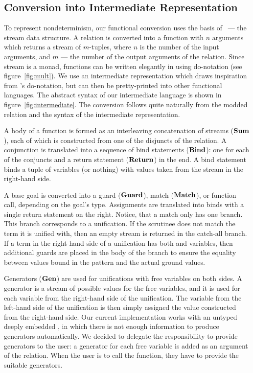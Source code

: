 

\subsection{Conversion into Intermediate Representation}

To represent nondeterminism, our functional conversion uses the basis of \mk~--- the stream data structure.
A relation is converted into a function with $n$ arguments which returns a stream of $m$-tuples, where $n$ is the number of the input arguments, and $m$ --- the number of the output arguments of the relation.
Since stream is a monad, functions can be written elegantly in \haskell using do-notation (see figure~\ref{fig:mult}).
We use an intermediate representation which draws inspiration from \haskell's do-notation, but can then be pretty-printed into other functional languages.
The abstract syntax of our intermediate language is shown in figure~\ref{fig:intermediate}.
The conversion follows quite naturally from the modded relation and the syntax of the intermediate representation.

A body of a function is formed as an interleaving concatenation of streams ($\operatorname{\mathbf{Sum}}$), each of which is constructed from one of the disjuncts of the relation.
A conjunction is translated into a sequence of bind statements ($\operatorname{\mathbf{Bind}}$): one for each of the conjuncts and a return statement ($\operatorname{\mathbf{Return}}$) in the end.
A bind statement binds a tuple of variables (or nothing) with values taken from the stream in the right-hand side.

A base goal is converted into a guard ($\operatorname{\mathbf{Guard}}$), match ($\operatorname{\mathbf{Match}}$), or function call, depending on the goal's type.
Assignments are translated into binds with a single return statement on the right.
Notice, that a match only has one branch.
This branch corresponds to a unification.
If the scrutinee does not match the term it is unified with, then an empty stream is returned in the catch-all branch.
If a term in the right-hand side of a unification has both \outm and \inm variables, then additional guards are placed in the body of the branch to ensure the equality between values bound in the pattern and the actual ground values.

Generators ($\operatorname{\mathbf{Gen}}$) are used for unifications with free variables on both sides.
A generator is a stream of possible values for the free variables, and it is used for each variable from the right-hand side of the unification.
The variable from the left-hand side of the unification is then simply assigned the value constructed from the right-hand side.
Our current implementation works with an untyped deeply embedded \mk, in which there is not enough information to produce generators automatically.
We decided to delegate the responsibility to provide generators to the user: a generator for each free variable is added as an argument of the relation.
When the user is to call the function, they have to provide the suitable generators.

